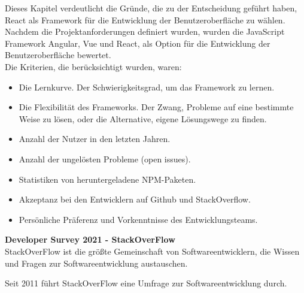 \begin{flushleft}
  Dieses Kapitel verdeutlicht die Gründe, die zu der Entscheidung geführt haben, React als Framework für die Entwicklung der Benutzeroberfläche zu wählen.
  \\
  Nachdem die Projektanforderungen definiert wurden, wurden die JavaScript Framework Angular, Vue und React, als Option für die Entwicklung der Benutzeroberfläche bewertet.
  \\
  Die Kriterien, die berücksichtigt wurden, waren:

  \begin{itemize}
    \item
          Die Lernkurve. Der Schwierigkeitsgrad, um das Framework zu lernen.

    \item
          Die Flexibilität des Frameworks.
          Der Zwang, Probleme auf eine bestimmte Weise zu lösen, oder die Alternative, eigene Lösungswege zu finden.

    \item
          Anzahl der Nutzer in den letzten Jahren.

    \item
          Anzahl der ungelösten Probleme (open issues).

    \item
          Statistiken von heruntergeladene NPM-Paketen.

    \item
          Akzeptanz bei den Entwicklern auf Github und StackOverflow.

    \item
          Persönliche Präferenz und Vorkenntnisse des Entwicklungsteams.
  \end{itemize}

\end{flushleft}

\begin{flushleft}
  \textbf{Developer Survey 2021 - StackOverFlow}\\
  StackOverFlow ist die größte Gemeinschaft von Softwareentwicklern, die Wissen und Fragen zur Softwareentwicklung austauschen.

  Seit 2011 führt StackOverFlow eine Umfrage zur Softwareentwicklung durch.
\end{flushleft}

